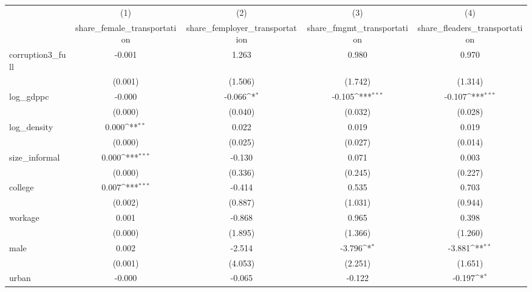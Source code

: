 {
\def\sym#1{\ifmmode^{#1}\else\(^{#1}\)\fi}
\begin{tabular}{l*{4}{c}}
\hline\hline
            &\multicolumn{1}{c}{(1)}&\multicolumn{1}{c}{(2)}&\multicolumn{1}{c}{(3)}&\multicolumn{1}{c}{(4)}\\
            &\multicolumn{1}{c}{share\_female\_transportation}&\multicolumn{1}{c}{share\_femployer\_transportation}&\multicolumn{1}{c}{share\_fmgmt\_transportation}&\multicolumn{1}{c}{share\_fleaders\_transportation}\\
\hline
corruption3\_full&      -0.001         &       1.263         &       0.980         &       0.970         \\
            &     (0.001)         &     (1.506)         &     (1.742)         &     (1.314)         \\
[1em]
log\_gdppc   &      -0.000         &      -0.066\sym{*}  &      -0.105\sym{***}&      -0.107\sym{***}\\
            &     (0.000)         &     (0.040)         &     (0.032)         &     (0.028)         \\
[1em]
log\_density &       0.000\sym{**} &       0.022         &       0.019         &       0.019         \\
            &     (0.000)         &     (0.025)         &     (0.027)         &     (0.014)         \\
[1em]
size\_informal&       0.000\sym{***}&      -0.130         &       0.071         &       0.003         \\
            &     (0.000)         &     (0.336)         &     (0.245)         &     (0.227)         \\
[1em]
college     &       0.007\sym{***}&      -0.414         &       0.535         &       0.703         \\
            &     (0.002)         &     (0.887)         &     (1.031)         &     (0.944)         \\
[1em]
workage     &       0.001         &      -0.868         &       0.965         &       0.398         \\
            &     (0.000)         &     (1.895)         &     (1.366)         &     (1.260)         \\
[1em]
male        &       0.002         &      -2.514         &      -3.796\sym{*}  &      -3.881\sym{**} \\
            &     (0.001)         &     (4.053)         &     (2.251)         &     (1.651)         \\
[1em]
urban       &      -0.000         &      -0.065         &      -0.122         &      -0.197\sym{*}  \\

\end{tabular}}
